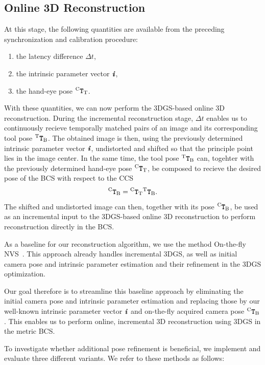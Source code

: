 \documentclass[a4paper,fleqn]{cas-dc}
\newcommand{\Vector}[1]{{\ensuremath{\textbf{\textit{#1}}}}}
\newcommand{\Matrix}[1]{{\ensuremath{\textbf{\texttt{#1}}}}}
\newcommand{\TMatrix}[3]{{^{\mathrm{#1}}\Matrix{#2}_{\mathrm{#3}}}}
\begin{document}
\subsection{Online 3D Reconstruction}\label{ssec:methodology:online_3d_reconstruction}
At this stage, the following quantities are available from the preceding synchronization and calibration procedure:
\begin{enumerate}
    \item the latency difference $\Delta t$,
    \item the intrinsic parameter vector $\Vector{i}$,
    \item the hand-eye pose $\TMatrix{C}{T}{T}$.
\end{enumerate}
With these quantities, we can now perform the 3DGS-based online 3D reconstruction. During the incremental reconstruction stage, $\Delta t$ enables us to continuously recieve temporally matched pairs of an image and its corresponding tool pose $\TMatrix{T}{T}{B}$. The obtained image is then, using the previously determined intrinsic parameter vector $\Vector{i}$, undistorted and shifted so that the principle point lies in the image center. In the same time, the tool pose $\TMatrix{T}{T}{B}$ can, togehter with the previously determined hand-eye pose $\TMatrix{C}{T}{T}$, be composed to recieve the desired pose of the BCS with respect to the CCS
\begin{equation}
    \label{eq:methodology:camera_pose_chain}
    \TMatrix{C}{T}{B} = \TMatrix{C}{T}{T} \TMatrix{T}{T}{B}.
\end{equation}
The shifted and undistorted image can then, together with its pose $\TMatrix{C}{T}{B}$, be used as an incremental input to the 3DGS-based online 3D reconstruction to perform reconstruction directly in the BCS.

As a baseline for our reconstruction algorithm, we use the method On-the-fly NVS~\cite{meuleman_--fly_2025}. This approach already handles incremental 3DGS, as well as initial camera pose and intrinsic parameter estimation and their refinement in the 3DGS optimization.

Our goal therefore is to streamline this baseline approach by eliminating the initial camera pose and intrinsic parameter estimation and replacing those by our well-known intrinsic parameter vector $\Vector{i}$ and on-the-fly acquired camera pose $\TMatrix{C}{T}{B}$. This enables us to perform online, incremental 3D reconstruction using 3DGS in the metric BCS. 

To investigate whether additional pose refinement is beneficial, we implement and evaluate three different variants. We refer to these methods as follows:
\end{document}

